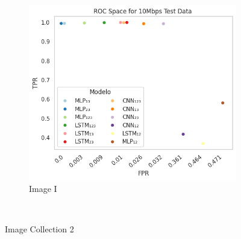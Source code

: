 \documentclass[a4paper,fleqn]{cas-sc}
\begin{document}
\begin{figure}
\begin{minipage}[t]{0.46\textwidth}
			~
			\begin{subfigure}[t]{0.33\textwidth}
				\includegraphics[draft=false, width=\textwidth]{./figs/ROC-Space-Test-Data-10Mbps.png} 
				\caption{Image I}
				\label{fig:1c}
			\end{subfigure}%
			~
		\hfill
		\caption{Image Collection 2\hspace{10cm}}
		\label{fig:2}
\end{minipage}

\end{figure}
\end{document}
